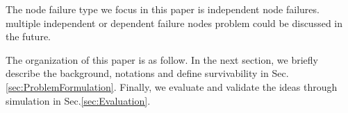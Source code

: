 The node failure type we focus in this paper is independent node failures. multiple independent or dependent failure nodes problem could be discussed in the future.


%

The organization of this paper is as follow. In the next section, we briefly describe the background, notations and define survivability in Sec.\ref{sec:ProblemFormulation}. Finally, we evaluate and validate the ideas through simulation in Sec.\ref{sec:Evaluation}.
